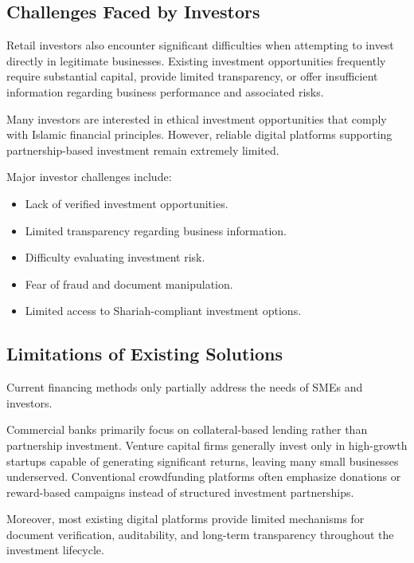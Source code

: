 
\subsection{Challenges Faced by Investors}

Retail investors also encounter significant difficulties when attempting to invest directly in legitimate businesses. Existing investment opportunities frequently require substantial capital, provide limited transparency, or offer insufficient information regarding business performance and associated risks.

Many investors are interested in ethical investment opportunities that comply with Islamic financial principles. However, reliable digital platforms supporting partnership-based investment remain extremely limited.

Major investor challenges include:

\begin{itemize}
\item Lack of verified investment opportunities.
\item Limited transparency regarding business information.
\item Difficulty evaluating investment risk.
\item Fear of fraud and document manipulation.
\item Limited access to Shariah-compliant investment options.
\end{itemize}


\subsection{Limitations of Existing Solutions}

Current financing methods only partially address the needs of SMEs and investors.

Commercial banks primarily focus on collateral-based lending rather than partnership investment. Venture capital firms generally invest only in high-growth startups capable of generating significant returns, leaving many small businesses underserved. Conventional crowdfunding platforms often emphasize donations or reward-based campaigns instead of structured investment partnerships.

Moreover, most existing digital platforms provide limited mechanisms for document verification, auditability, and long-term transparency throughout the investment lifecycle.

